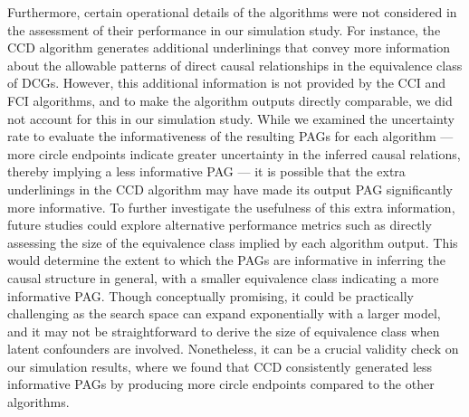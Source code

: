 \documentclass[twoside, 11pt]{article}
\begin{document}
Furthermore, certain operational details of the algorithms were not considered in the assessment of their performance in our simulation study.
For instance, the CCD algorithm generates additional underlinings that convey more information about the allowable patterns of direct causal relationships in the equivalence class of DCGs. However, this additional information is not provided by the CCI and FCI algorithms, and to make the algorithm outputs directly comparable, we did not account for this in our simulation study. 
While we examined the uncertainty rate to evaluate the informativeness of the resulting PAGs for each algorithm --- more circle endpoints indicate greater uncertainty in the inferred causal relations, thereby implying a less informative PAG --- it is possible that the extra underlinings in the CCD algorithm may have made its output PAG significantly more informative. To further investigate the usefulness of this extra information, future studies could explore alternative performance metrics such as directly assessing the size of the equivalence class implied by each algorithm output. 
This would determine the extent to which the PAGs are informative in inferring the causal structure in general, with a smaller equivalence class indicating a more informative PAG. Though conceptually promising, it could be practically challenging as the search space can expand exponentially with a larger model, and it may not be straightforward to derive the size of equivalence class when latent confounders are involved. Nonetheless, it can be a crucial validity check on our simulation results, where we found that CCD consistently generated less informative PAGs by producing more circle endpoints compared to the other algorithms.

\end{document}
